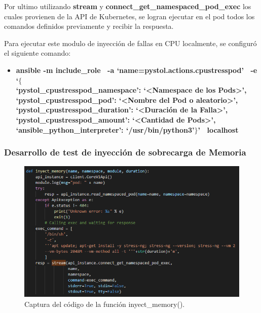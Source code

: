 \par Por ultimo utilizando \textbf{stream} y \textbf{connect\_get\_namespaced\_pod\_exec} los cuales provienen de la API de Kubernetes, se logran ejecutar en el pod todos los comandos definidos previamente y recibir la respuesta.\\

\par Para ejecutar este modulo de inyección de fallas en CPU localmente, se configur\'o el siguiente comando:
\begin{itemize}
    \item \textbf{ansible -m include\_role \ -a `name=pystol.actions.cpustresspod' \ -e `$\{$ \\   
    `pystol\_cpustresspod\_namespace': `<Namespace de los Pods>',\\
    `pystol\_cpustresspod\_pod': `<Nombre del Pod o aleatorio>',\\
    `pystol\_cpustresspod\_duration': `<Duración de la Falla>',\\
    `pystol\_cpustresspod\_amount': `<Cantidad de Pods>',\\
    `ansible\_python\_interpreter': `/usr/bin/python3'$\}$' \ localhost} %
\end{itemize}


\subsubsection{Desarrollo de test de inyección de sobrecarga de Memoria}

\begin{figure}[htpb!]
	\centering
	\includegraphics[width=0.95\columnwidth]{images/captures/codigo/Capture_inyect_memory.PNG}
	\caption{Captura del código de la función inyect\_memory().}
	\label{fig:codi04}
\end{figure}

